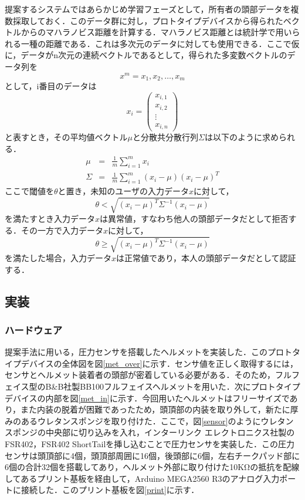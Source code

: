 \documentclass[Japanese]{dicomopapers}
\begin{document}
提案するシステムではあらかじめ学習フェーズとして，所有者の頭部データを複数採取しておく．このデータ群に対し，プロトタイプデバイスから得られたベクトルからのマハラノビス距離を計算する．マハラノビス距離とは統計学で用いられる一種の距離である．これは多次元のデータに対しても使用できる．ここで仮に，データがn次元の連続ベクトルであるとして，得られた多変数ベクトルのデータ列を
\[
  x^m = x_1, x_2, \ldots, x_m
\]
として，i番目のデータは
\[
  x_i = \left(
        \begin{array}{c}
            x_{i,1} \\
            x_{i,2} \\
            \vdots \\
            x_{i,n}
        \end{array}
    \right)
\]
と表すとき，その平均値ベクトル$\mu$と分散共分散行列$\Sigma$は以下のように求められる．
\begin{eqnarray*}
  \mu &=& \frac{1}{m}\sum_{i=1}^{m}x_i \\
  \Sigma &=& \frac{1}{m}\sum_{i=1}^{m}(x_i-\mu)(x_i-\mu)^T
\end{eqnarray*}
ここで閾値を$\theta$と置き，未知のユーザの入力データ$x$に対して，
\[
  \theta < \sqrt{(x_i-\mu)^{T}\Sigma^{-1}(x_i-\mu)}
\]
を満たすとき入力データ$x$は異常値，すなわち他人の頭部データだとして拒否する．その一方で入力データ$x$に対して，
\[
  \theta \geq \sqrt{(x_i-\mu)^{T}\Sigma^{-1}(x_i-\mu)}
\]
を満たした場合，入力データ$x$は正常値であり，本人の頭部データだとして認証する．

\subsection{実装}
\subsubsection{ハードウェア}
提案手法に用いる，圧力センサを搭載したヘルメットを実装した．このプロトタイプデバイスの全体図を図\ref{met_over}に示す．センサ値を正しく取得するには，センサとヘルメット装着者の頭部が密着している必要がある．そのため，フルフェイス型のB\&B社製BB100フルフェイスヘルメットを用いた．次にプロトタイプデバイスの内部を図\ref{met_in}に示す．今回用いたヘルメットはフリーサイズであり，また内装の脱着が困難であったため，頭頂部の内装を取り外して，新たに厚みのあるウレタンスポンジを取り付けた．ここで，図\ref{sensor}のようにウレタンスポンジの中央部に切り込みを入れ，インターリンク エレクトロニクス社製のFSR402，FSR402 ShortTailを挿し込むことで圧力センサを実装した．この圧力センサは頭頂部に4個，頭頂部周囲に16個，後頭部に6個，左右チークパッド部に6個の合計32個を搭載してあり，ヘルメット外部に取り付けた10KΩの抵抗を配線してあるプリント基板を経由して，Arduino MEGA2560 R3のアナログ入力ポートに接続した．このプリント基板を図\ref{print}に示す．
\end{document}
